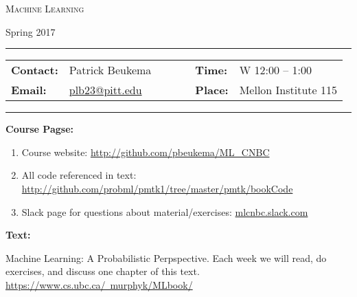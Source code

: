 \documentclass[11pt, a4paper]{article}
\begin{document}
\begin{center}
{\Large \textsc{Machine Learning}}
\end{center}
\begin{center}
Spring 2017
\end{center}

\begin{center}
\rule{6in}{0.4pt}
\begin{minipage}[t]{.75\textwidth}
\begin{tabular}{llcccll}
\textbf{Contact:} & Patrick Beukema & & &  & \textbf{Time:} & W 12:00 -- 1:00 \\
\textbf{Email:} &  \href{plb23@pitt.edu}{plb23@pitt.edu} & & & & \textbf{Place:} & Mellon Institute 115
\end{tabular}
\end{minipage}
\rule{6in}{0.4pt}
\end{center}
\vspace{.5cm}
\setlength{\unitlength}{1in}
\renewcommand{\arraystretch}{2}

\noindent\textbf{Course Pagse:}

\begin{enumerate}

\item Course website: \url{http://github.com/pbeukema/ML_CNBC}

\item All code referenced in text: \url{http://github.com/probml/pmtk1/tree/master/pmtk/bookCode}


\item Slack page for questions about material/exercises: \url{mlcnbc.slack.com}

\end{enumerate}

\noindent\textbf{Text:} %

Machine Learning: A Probabilistic Perpspective. Each week we will read, do exercises, and discuss one chapter of this text. \href{https://www.cs.ubc.ca/~murphyk/MLbook/}{https://www.cs.ubc.ca/~murphyk/MLbook/}
\end{document}
